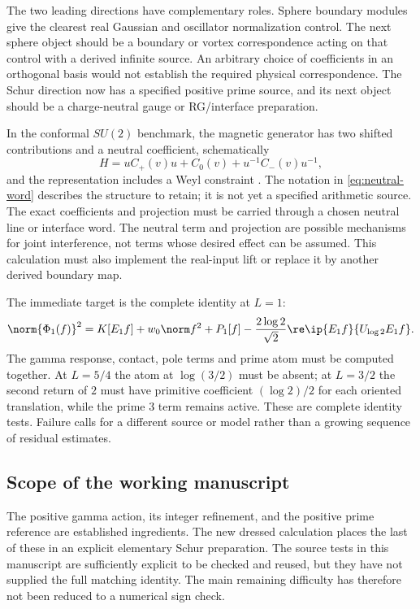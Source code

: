 The two leading directions have complementary roles. Sphere boundary
modules give the clearest real Gaussian and oscillator normalization
control. The next sphere object should be a boundary or vortex
correspondence acting on that control with a derived infinite source.
An arbitrary choice of coefficients in an orthogonal basis would not
establish the required physical correspondence. The Schur direction
now has a specified positive prime source, and its next object should
be a charge-neutral gauge or RG/interface preparation.

In the conformal $SU(2)$ benchmark, the magnetic generator has two
shifted contributions and a neutral coefficient, schematically
\begin{equation}\label{eq:neutral-word}
 H=uC_+(v)u+C_0(v)+u^{-1}C_-(v)u^{-1},
\end{equation}
and the representation includes a Weyl constraint
\cite[Sections 5.1.2--5.1.3]{Schur}. The notation in
\eqref{eq:neutral-word} describes the structure to retain; it is not
yet a specified arithmetic source. The exact coefficients and projection
must be carried through a chosen neutral line or interface word. The
neutral term and projection are possible mechanisms for joint
interference, not terms whose desired effect can be assumed. This
calculation must also implement the real-input lift or replace it by
another derived boundary map.

The immediate target is the complete identity at $L=1$:
\begin{equation}\label{eq:first-target}
 \norm{\Phi_1(f)}^2=K[E_1f]+w_0\norm f^2+P_1[f]
 -\frac{2\log2}{\sqrt2}\re\ip{E_1f}{U_{\log2}E_1f}.
\end{equation}
The gamma response, contact, pole terms and prime atom must be computed
together. At $L=5/4$ the atom at $\log(3/2)$ must be absent; at $L=3/2$
the second return of $2$ must have primitive coefficient $(\log2)/2$
for each oriented translation, while the prime $3$ term remains active.
These are complete identity tests. Failure calls for a different source
or model rather than a growing sequence of residual estimates.

\subsection{Scope of the working manuscript}
The positive gamma action, its integer refinement, and the positive
prime reference are established ingredients. The new dressed calculation
places the last of these in an explicit elementary Schur preparation.
The source tests in this manuscript are sufficiently explicit to be
checked and reused, but they have not supplied the full matching
identity. The main remaining difficulty has therefore not been reduced
to a numerical sign check.

